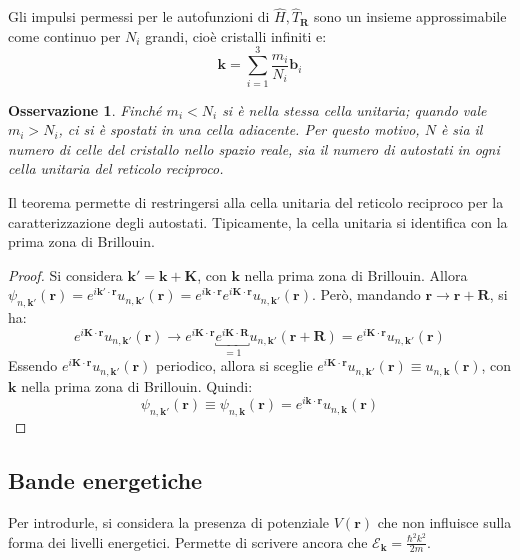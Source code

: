 \documentclass[10pt, a4paper]{scrartcl}
\numberwithin{equation}{subsection}
\theoremstyle{style1}
\newtheorem{osservazione}{Osservazione}[section]
\theoremstyle{style2}
\begin{document}
Gli impulsi permessi per le autofunzioni di $\hat{H}, \hat{T}_\mathbf{R} $ sono un insieme approssimabile come continuo per $N_i$ grandi, cio\`e cristalli infiniti e:
\begin{equation}
	\mathbf{k} = \sum_{i=1}^{3} \frac{m_i}{N_i} \mathbf{b} _i
\end{equation}
\begin{osservazione}
	Finch\'e $m_i < N_i$ si \`e nella stessa cella unitaria; quando vale $m_i > N_i$, ci si \`e spostati in una cella adiacente. Per questo motivo, $N$ \`e sia il numero di celle del cristallo nello spazio reale, sia il numero di autostati in ogni cella unitaria del reticolo reciproco.
\end{osservazione}
Il teorema permette di restringersi alla cella unitaria del reticolo reciproco per la caratterizzazione degli autostati. Tipicamente, la cella unitaria si identifica con la prima zona di Brillouin.
\begin{proof}
	Si considera $\mathbf{k} ' = \mathbf{k} + \mathbf{K} $, con $\mathbf{k} $ nella prima zona di Brillouin. Allora $\psi _{n, \mathbf{k}' } (\mathbf{r} ) = e^{ i \mathbf{k} ' \cdot \mathbf{r} } u_{n, \mathbf{k} '} (\mathbf{r} )=e^{i \mathbf{k} \cdot \mathbf{r} } e^{i \mathbf{K} \cdot \mathbf{r} } u_{n ,\mathbf{k} '} (\mathbf{r} ) $. Per\`o, mandando $\mathbf{r} \to \mathbf{r } + \mathbf{R} $, si ha:
	\[
		e^{i \mathbf{K} \cdot \mathbf{r} } u_{n,\mathbf{k} '} (\mathbf{r} )\to e^{i \mathbf{K} \cdot \mathbf{r} } \underbracket{e^{i \mathbf{K} \cdot \mathbf{R} }}_{=1}  u_{n,\mathbf{k} '} (\mathbf{r} +\mathbf{R}) = e^{i \mathbf{K} \cdot \mathbf{r} } u_{n,\mathbf{k} '} (\mathbf{r} )
	\] 
	Essendo $e^{i \mathbf{K} \cdot \mathbf{r} } u_{n,\mathbf{k} '} (\mathbf{r} )$ periodico, allora si sceglie $e^{i\mathbf{K} \cdot \mathbf{r} } u_{n,\mathbf{k} '} (\mathbf{r} ) \equiv u_{n,\mathbf{k} } (\mathbf{r} )$, con $\mathbf{k} $ nella prima zona di Brillouin. Quindi:
	\begin{equation}
		\psi _{n, \mathbf{k}' }(\mathbf{r} ) \equiv \psi _{n,\mathbf{k} }(\mathbf{r} ) = e^{i \mathbf{k} \cdot \mathbf{r} } u_{n,\mathbf{k} } (\mathbf{r} )
	\end{equation}
\end{proof}
\subsection{Bande energetiche}
Per introdurle, si considera la presenza di potenziale $V(\mathbf{r} )$ che non influisce sulla forma dei livelli energetici. Permette di scrivere ancora che $\mathscr{E}_\mathbf{k}  = \frac{\hbar ^2 k^2}{2m}$.
\end{document}
